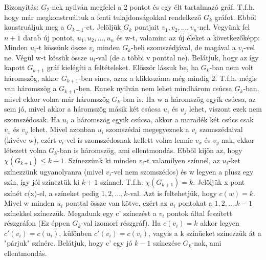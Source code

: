 \begin{leftbar}
Bizonyítás: $G_2$-nek nyilván megfelel a 2 pontot és egy élt tartalmazó gráf. T.f.h. hogy már megkonstruáltuk a fenti tulajdonságokkal rendelkező $G_k$ gráfot. Ebből konstruáljuk meg a $G_{k+1}$-et. Jelöljük $G_k$ pontjait $v_1, v_2,..., v_n$-nel. Vegyünk fel $n + 1$ darab új pontot, $u_1, u_2,..., u_n$ és w-t, valamint az új éleket a következőképp: Minden $u_i$-t kössünk össze $v_i$ minden $G_k$-beli szomszédjával, de magával a $v_i$-vel ne. Végül w-t kössük össze $u_i$-val (de a többi v ponttal ne). Belátjuk, hogy az így kapott $G_{k+1}$ gráf kielégíti a feltételeket. Először lássuk be, ha $G_k$-ban nem volt háromszög, akkor $G_{k+1}$-ben sincs, azaz a klikkszáma még mindig 2. T.f.h. mégis van háromszög a $G_{k+1}$-ben. Ennek nyilván nem lehet mindhárom csúcsa $G_k$-ban, mivel ekkor volna már háromszög $G_k$-ban is. Ha w a háromszög egyik csúcsa, az sem jó, mivel akkor a háromszög másik két csúcsa $u_i$ és $u_j$ lehet, viszont ezek nem szomszédosak. Ha $u_i$ a háromszög egyik csúcsa, akkor a maradék két csúcs csak $v_x$ és $v_y$ lehet. Mivel azonban $u_i$ szomszédai megegyeznek a $v_i$ szomszédaival (kivéve w), ezért $v_i$-vel is szomszédosnak kellett volna lennie $v_x$ és $v_y$-nak, ekkor létezett volna $G_k$-ban is háromszög, ami ellentmondás. Ebből kijön az, hogy $\chi(G_{k+1}) \leq k + 1$. Színezzünk ki minden $v_i$-t valamilyen színnel, az $u_i$-ket színezzünk ugyanolyanra (mivel $v_i$-vel nem szomszédos) és w legyen a plusz egy szín, így jól színeztük ki $k+1$ színnel. T.f.h. $\chi(G_{k+1}) = k$. Jelöljük x pont színét c(x)-el, a színeket pedig $1, 2,..., k$-val. Azt is feltehetjük, hogy $c(w) = k$. Mivel w minden $u_i$ ponttal össze van kötve, ezért az $u_i$ pontokat a $1, 2,....k - 1$ színekkel színezzük. Megadunk egy c' színezést a $v_i$ pontok által feszített részgráfon (Ez éppen $G_k$-val izomorf részgráf). Ha $c(v_i) = k$ akkor legyen $c'(v_i) = c(u_i)$, különben $c'(v_i) = c(v_i)$, vagyis a k színűeket színezzük át a "párjuk" színére. Belátjuk, hogy c' egy jó $k-1$ színezése $G_k$-nak, ami ellentmondás.
\end{leftbar}
